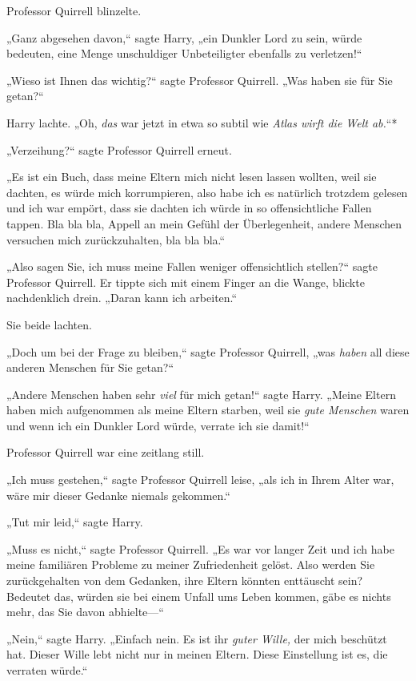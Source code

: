 {Professor Quirrell blinzelte.

„Ganz abgesehen davon,“ sagte Harry, „ein Dunkler Lord zu sein, würde bedeuten, eine Menge unschuldiger Unbeteiligter ebenfalls zu verletzen!“

„Wieso ist Ihnen das wichtig?“ sagte Professor Quirrell. „Was haben sie für Sie getan?“

Harry lachte. „Oh, \emph{das} war jetzt in etwa so subtil wie \emph{Atlas wirft die Welt ab.}“*

„Verzeihung?“ sagte Professor Quirrell erneut.

„Es ist ein Buch, dass meine Eltern mich nicht lesen lassen wollten, weil sie dachten, es würde mich korrumpieren, also habe ich es natürlich trotzdem gelesen und ich war empört, dass sie dachten ich würde in so offensichtliche Fallen tappen. Bla bla bla, Appell an mein Gefühl der Überlegenheit, andere Menschen versuchen mich zurückzuhalten, bla bla bla.“

„Also sagen Sie, ich muss meine Fallen weniger offensichtlich stellen?“ sagte Professor Quirrell. Er tippte sich mit einem Finger an die Wange, blickte nachdenklich drein. „Daran kann ich arbeiten.“

Sie beide lachten.

„Doch um bei der Frage zu bleiben,“ sagte Professor Quirrell, „was \emph{haben} all diese anderen Menschen für Sie getan?“

„Andere Menschen haben sehr \emph{viel} für mich getan!“ sagte Harry. „Meine Eltern haben mich aufgenommen als meine Eltern starben, weil sie \emph{gute Menschen} waren und wenn ich ein Dunkler Lord würde, verrate ich sie damit!“

Professor Quirrell war eine zeitlang still.

„Ich muss gestehen,“ sagte Professor Quirrell leise, „als ich in Ihrem Alter war, wäre mir dieser Gedanke niemals gekommen.“

„Tut mir leid,“ sagte Harry.

„Muss es nicht,“ sagte Professor Quirrell. „Es war vor langer Zeit und ich habe meine familiären Probleme zu meiner Zufriedenheit gelöst. Also werden Sie zurückgehalten von dem Gedanken, ihre Eltern könnten enttäuscht sein? Bedeutet das, würden sie bei einem Unfall ums Leben kommen, gäbe es nichts mehr, das Sie davon abhielte—“

„Nein,“ sagte Harry. „Einfach nein. Es ist ihr \emph{guter Wille,} der mich beschützt hat. Dieser Wille lebt nicht nur in meinen Eltern. Diese Einstellung ist es, die verraten würde.“

}
